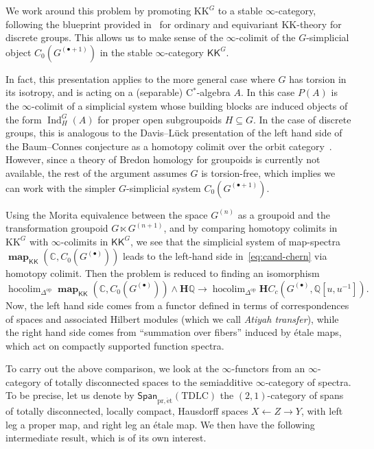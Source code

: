 \documentclass[a4paper,reqno]{amsart}
\theoremstyle{plain}
\theoremstyle{definition}
\theoremstyle{remark}
\numberwithin{equation}{section}
\newcommand{\dC}{\mathbb{C}}
\newcommand{\dQ}{\mathbb{Q}}
\newcommand{\bH}{\mathbf{H}}
\newcommand{\Span}{\mathsf{Span}}
\DeclareMathOperator*{\hocolim}{hocolim}
\newcommand{\KK}{\mathrm{KK}}
\newcommand{\icKK}{\mathsf{KK}}
\newcommand{\opo}{\mathrm{op}}
\newcommand{\pret}{\mathrm{pr,\acute{e}t}}
\newcommand{\TDLC}{\mathrm{TDLC}}
\DeclareMathOperator{\Ind}{Ind}
\DeclareMathOperator{\map}{\mathbf{map}}
\begin{document}
We work around this problem by promoting $\KK^G$ to a stable $\infty$-category, following the blueprint provided in~ for ordinary and equivariant $\KK$-theory for discrete groups.
This allows us to make sense of the $\infty$-colimit of the $G$-simplicial object $C_0(G^{(\bullet+1)})$ in the stable $\infty$-category $\icKK^G$. 

In fact, this presentation applies to the more general case where $G$ has torsion in its isotropy, and is acting on a (separable) C$^*$-algebra $A$. In this case $P(A)$ is the $\infty$-colimit of a simplicial system whose building blocks are induced objects of the form $\Ind_H^G(A)$ for proper open subgroupoids $H\subseteq G$.
In the case of discrete groups, this is analogous to the Davis--Lück presentation of the left hand side of the Baum--Connes conjecture as a homotopy colimit over the orbit category~\cite{dl:bc}. However, since a theory of Bredon homology for groupoids is currently not available, the rest of the argument assumes $G$ is torsion-free, which implies we can work with the simpler $G$-simplicial system $C_0(G^{(\bullet+1)})$.

Using the Morita equivalence between the space $G^{(n)}$ as a groupoid and the transformation groupoid $G \ltimes G^{(n + 1)}$, and by comparing homotopy colimits in $\KK^G$ with $\infty$-colimits in $\icKK^G$, we see that the simplicial system of map-spectra $\map_{\icKK}(\dC,C_0(G^{(\bullet)}))$ leads to the left-hand side in~\eqref{eq:cand-chern} via homotopy colimit.
Then the problem is reduced to finding an isomorphism
\begin{equation}\label{eq:hl-chern}
\hocolim_{\Delta^\opo} \map_{\icKK}(\dC,C_0(G^{(\bullet)}))\wedge \bH\dQ \to \hocolim_{\Delta^\opo} \bH C_c(G^{(\bullet)},\dQ[u,u^{-1}]).
\end{equation}
Now, the left hand side comes from a functor defined in terms of correspondences of spaces and associated Hilbert modules (which we call \emph{Atiyah transfer}), while the right hand side comes from ``summation over fibers'' induced by étale maps, which act on compactly supported function spectra.

To carry out the above comparison, we look at the $\infty$-functors from an $\infty$-category of totally disconnected spaces to the semiadditive $\infty$-category of spectra.
To be precise, let us denote by $\Span_{\pret}(\TDLC)$ the $(2,1)$-category of spans of totally disconnected, locally compact, Hausdorff spaces $X \leftarrow Z \to Y$, with left leg a proper map, and right leg an étale map.
We then have the following intermediate result, which is of its own interest.
\end{document}
